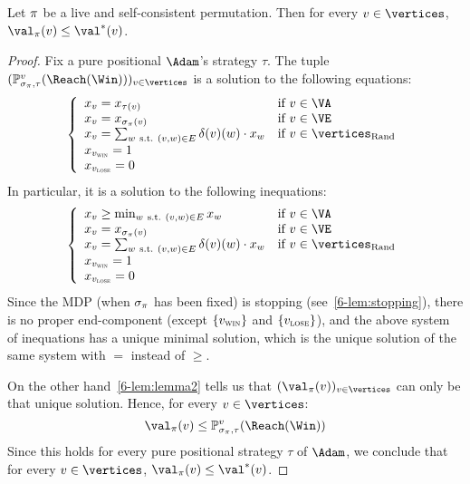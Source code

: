 \begin{lemma}
\label{6-lem:live_self-consistent_lower_bound}
Let $\pi$ be a live and self-consistent permutation.  Then for
every $v \in \vertices$,  $\val_\perm(v) \le \val^*(v)$.
\end{lemma}

\begin{proof}
Fix a pure positional $\Adam$'s strategy $\tau$. The tuple
$(\probm_{\sigma_\perm,\tau}^v(\Reach(\Win)))_{v \in \vertices}$ is
a solution to the following equations:
\[
\left\{\begin{array}{ll} x_v =
    x_{\tau(v)} & \text{if}\ v \in \Adamvertices \\
    x_v = x_{\sigma_\perm(v)} & \text{if}\ v \in \Evevertices \\
    x_v = \sum_{w\ \text{s.t.}\ (v,w) \in E} \delta(v)(w) \cdot
    x_w  & \text{if}\ v \in \Randomvertices \\
    x_{\vwin} = 1 \\
    x_{\vlose} = 0
  \end{array}\right.
\]
In particular, it is a solution to the following inequations:
\[
\left\{\begin{array}{ll} 
    x_v \ge \min_{w\ \text{s.t.}\ (v,w) \in E}
    x_w & \text{if}\ v \in \Adamvertices \\
    x_v = x_{\sigma_\perm(v)}  & \text{if}\ v \in \Evevertices \\
    x_v = \sum_{w\ \text{s.t.}\ (v,w) \in E} \delta(v)(w) \cdot x_w
    & \text{if}\ v \in \Randomvertices \\
    x_{\vwin} = 1 \\
    x_{\vlose} = 0
  \end{array}\right.
\]
Since the MDP (when $\sigma_\pi$ has been fixed) is stopping (see~\cref{6-lem:stopping}), there is no proper end-component
(except $\{v_{\textsc{win}}\}$ and $\{v_{\textsc{lose}}\}$), and the above system of
inequations has a unique minimal solution, which is the unique
solution of the same system with $=$ instead of $\ge$.

On the other hand~\cref{6-lem:lemma2} tells us that
$(\val_\perm(v))_{v \in\vertices}$ can only be that unique
solution. Hence, for every $v \in \vertices$:
\[
\val_\perm(v) \le \probm_{\sigma_\perm,\tau}^v(\Reach(\Win))
\]
Since this holds for every pure positional strategy $\tau$ of $\Adam$,
we conclude that for every $v \in \vertices$,
$\val_\perm(v) \le \val^*(v)$.
\end{proof}

